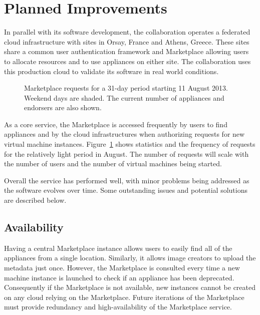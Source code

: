 \section{Planned Improvements}
\label{sec:production}

In parallel with its software development, the collaboration operates
a federated cloud infrastructure with sites in Orsay, France and
Athens, Greece\@.  These sites share a common user authentication
framework and Marketplace allowing users to allocate resources and to
use appliances on either site.  The collaboration uses this production
cloud to validate its software in real world conditions.

\begin{figure}
\caption{Marketplace requests for a 31-day period starting 11 August
  2013.  Weekend days are shaded.  The current number of appliances
  and endorsers are also shown.}
\label{fig:requests}
\end{figure}

As a core service, the Marketplace is accessed frequently by users to
find appliances and by the cloud infrastructures when authorizing
requests for new virtual machine instances.  Figure~\ref{fig:requests}
shows statistics and the frequency of requests for the relatively
light period in August\@.  The number of requests will scale with the
number of users and the number of virtual machines being started.

Overall the service has performed well, with minor problems being
addressed as the software evolves over time.  Some outstanding issues
and potential solutions are described below.

\subsection{Availability}

Having a central Marketplace instance allows users to easily find all
of the appliances from a single location.  Similarly, it allows image
creators to upload the metadata just once.  However, the Marketplace
is consulted every time a new machine instance is launched to check if
an appliance has been deprecated.  Consequently if the Marketplace is
not available, new instances cannot be created on any cloud relying on
the Marketplace\@.  Future iterations of the Marketplace must provide
redundancy and high-availability of the Marketplace service. 

